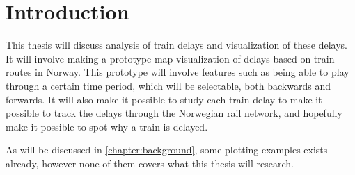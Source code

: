 
\chapter{Introduction}
\label{chapter:introduction}

This thesis will discuss analysis of train delays and visualization of these
delays. It will involve making a prototype map visualization of delays based on
train routes in Norway. This prototype will involve features such as being able
to play through a certain time period, which will be selectable, both backwards
and forwards. It will also make it possible to study each train delay to make
it possible to track the delays through the Norwegian rail network, and
hopefully make it possible to spot why a train is delayed.

As will be discussed in \vref{chapter:background}, some plotting examples
exists already, however none of them covers what this thesis will research.
